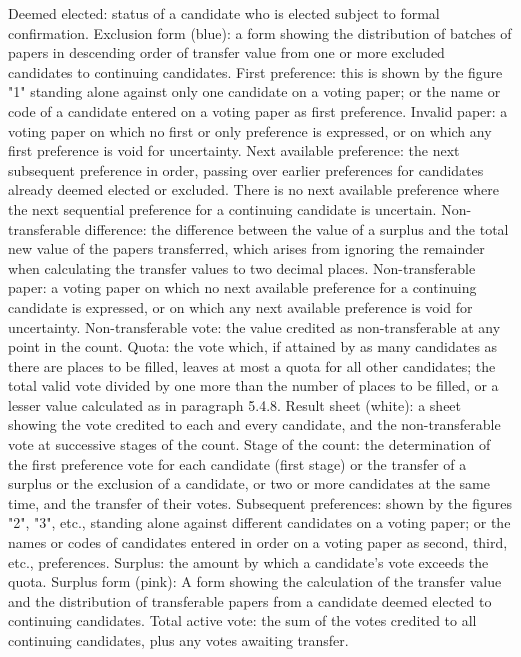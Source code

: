 Deemed elected: status of a candidate who is elected subject to formal confirmation.
Exclusion form (blue): a form showing the distribution of batches of papers in descending order of transfer value from one or more excluded candidates to continuing candidates.
First preference: this is shown by the figure "1" standing alone against only one candidate on a voting paper; or the name or code of a candidate entered on a voting paper as first preference.
Invalid paper: a voting paper on which no first or only preference is expressed, or on which any first preference is void for uncertainty.
Next available preference: the next subsequent preference in order, passing over earlier preferences for candidates already deemed elected or excluded. There is no next available preference where the next sequential preference for a continuing candidate is uncertain.
Non-transferable difference: the difference between the value of a surplus and the total new value of the papers transferred, which arises from ignoring the remainder when calculating the transfer values to two decimal places.
Non-transferable paper: a voting paper on which no next available preference for a continuing candidate is expressed, or on which any next available preference is void for uncertainty.
Non-transferable vote: the value credited as non-transferable at any point in the count.
Quota: the vote which, if attained by as many candidates as there are places to be filled, leaves at most a quota for all other candidates; the total valid vote divided by one more than the number of places to be filled, or a lesser value calculated as in paragraph 5.4.8.
Result sheet (white): a sheet showing the vote credited to each and every candidate, and the non-transferable vote at successive stages of the count.
Stage of the count: the determination of the first preference vote for each candidate (first stage)
or the transfer of a surplus
or the exclusion of a candidate, or two or more candidates at the same time, and the transfer of their votes.
Subsequent preferences: shown by the figures "2", "3", etc., standing alone against different candidates on a voting paper; or the names or codes of candidates entered in order on a voting paper as second, third, etc., preferences.
Surplus: the amount by which a candidate's vote exceeds the quota.
Surplus form (pink): A form showing the calculation of the transfer value and the distribution of transferable papers from a candidate deemed elected to continuing candidates.
Total active vote: the sum of the votes credited to all continuing candidates, plus any votes awaiting transfer.
